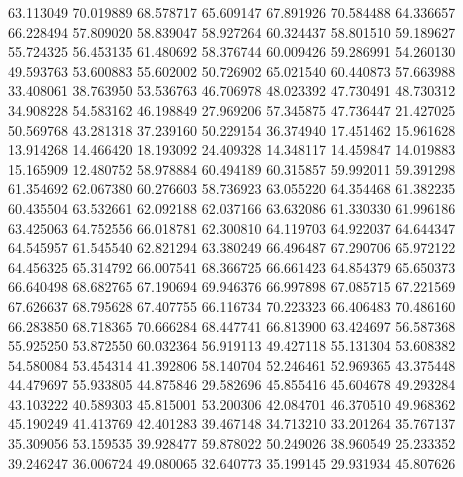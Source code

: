 63.113049
70.019889
68.578717
65.609147
67.891926
70.584488
64.336657
66.228494
57.809020
58.839047
58.927264
60.324437
58.801510
59.189627
55.724325
56.453135
61.480692
58.376744
60.009426
59.286991
54.260130
49.593763
53.600883
55.602002
50.726902
65.021540
60.440873
57.663988
33.408061
38.763950
53.536763
46.706978
48.023392
47.730491
48.730312
34.908228
54.583162
46.198849
27.969206
57.345875
47.736447
21.427025
50.569768
43.281318
37.239160
50.229154
36.374940
17.451462
15.961628
13.914268
14.466420
18.193092
24.409328
14.348117
14.459847
14.019883
15.165909
12.480752
58.978884
60.494189
60.315857
59.992011
59.391298
61.354692
62.067380
60.276603
58.736923
63.055220
64.354468
61.382235
60.435504
63.532661
62.092188
62.037166
63.632086
61.330330
61.996186
63.425063
64.752556
66.018781
62.300810
64.119703
64.922037
64.644347
64.545957
61.545540
62.821294
63.380249
66.496487
67.290706
65.972122
64.456325
65.314792
66.007541
68.366725
66.661423
64.854379
65.650373
66.640498
68.682765
67.190694
69.946376
66.997898
67.085715
67.221569
67.626637
68.795628
67.407755
66.116734
70.223323
66.406483
70.486160
66.283850
68.718365
70.666284
68.447741
66.813900
63.424697
56.587368
55.925250
53.872550
60.032364
56.919113
49.427118
55.131304
53.608382
54.580084
53.454314
41.392806
58.140704
52.246461
52.969365
43.375448
44.479697
55.933805
44.875846
29.582696
45.855416
45.604678
49.293284
43.103222
40.589303
45.815001
53.200306
42.084701
46.370510
49.968362
45.190249
41.413769
42.401283
39.467148
34.713210
33.201264
35.767137
35.309056
53.159535
39.928477
59.878022
50.249026
38.960549
25.233352
39.246247
36.006724
49.080065
32.640773
35.199145
29.931934
45.807626
